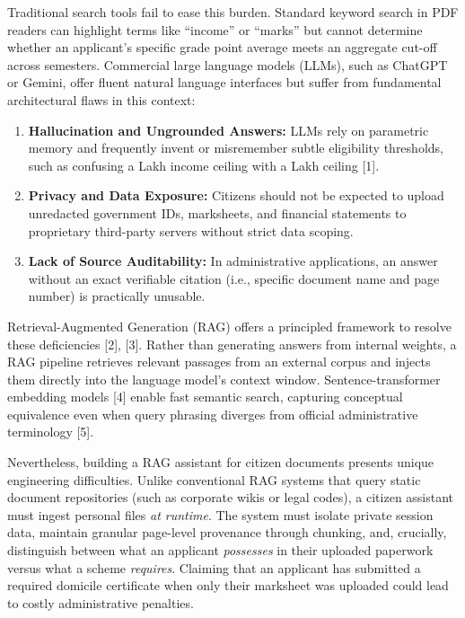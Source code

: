 \documentclass[conference]{IEEEtran}
\begin{document}
Traditional search tools fail to ease this burden. Standard keyword search in PDF readers can highlight terms like ``income'' or ``marks'' but cannot determine whether an applicant's specific grade point average meets an aggregate cut-off across semesters. Commercial large language models (LLMs), such as ChatGPT or Gemini, offer fluent natural language interfaces but suffer from fundamental architectural flaws in this context:
\begin{enumerate}
    \item \textbf{Hallucination and Ungrounded Answers:} LLMs rely on parametric memory and frequently invent or misremember subtle eligibility thresholds, such as confusing a  Lakh income ceiling with a  Lakh ceiling [1].
    \item \textbf{Privacy and Data Exposure:} Citizens should not be expected to upload unredacted government IDs, marksheets, and financial statements to proprietary third-party servers without strict data scoping.
    \item \textbf{Lack of Source Auditability:} In administrative applications, an answer without an exact verifiable citation (i.e., specific document name and page number) is practically unusable.
\end{enumerate}

Retrieval-Augmented Generation (RAG) offers a principled framework to resolve these deficiencies [2], [3]. Rather than generating answers from internal weights, a RAG pipeline retrieves relevant passages from an external corpus and injects them directly into the language model's context window. Sentence-transformer embedding models [4] enable fast semantic search, capturing conceptual equivalence even when query phrasing diverges from official administrative terminology [5]. 

Nevertheless, building a RAG assistant for citizen documents presents unique engineering difficulties. Unlike conventional RAG systems that query static document repositories (such as corporate wikis or legal codes), a citizen assistant must ingest personal files \textit{at runtime}. The system must isolate private session data, maintain granular page-level provenance through chunking, and, crucially, distinguish between what an applicant \textit{possesses} in their uploaded paperwork versus what a scheme \textit{requires}. Claiming that an applicant has submitted a required domicile certificate when only their marksheet was uploaded could lead to costly administrative penalties.
\end{document}
